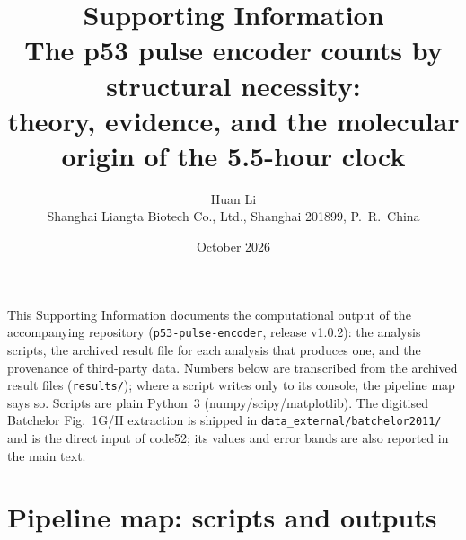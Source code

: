 \documentclass[11pt]{article}
\title{\bfseries Supporting Information\\[4pt]
\large The p53 pulse encoder counts by structural necessity:\\
theory, evidence, and the molecular origin of the 5.5-hour clock}
\author{Huan Li\\ \small Shanghai Liangta Biotech Co., Ltd., Shanghai 201899, P.\ R.\ China}
\date{October 2026}
\begin{document}
\sloppy
\maketitle

\noindent This Supporting Information documents the computational output of
the accompanying repository (\texttt{p53-pulse-encoder}, release v1.0.2): the
analysis scripts, the archived result file for each analysis that produces
one, and the provenance of third-party data. Numbers below are transcribed
from the archived result files (\texttt{results/}); where a script writes only
to its console, the pipeline map says so. Scripts are plain Python~3
(numpy/scipy/matplotlib). The digitised Batchelor Fig.~1G/H extraction is shipped in
\texttt{data\_external/batchelor2011/} and is the direct input of code52; its
values and error bands are also reported in the main text.

\tableofcontents
\newpage

\section{Pipeline map: scripts and outputs}
\end{document}
